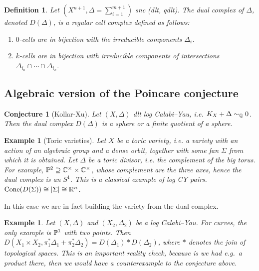 \documentclass[A4paper, british, reqno]{amsart}
\theoremstyle{darkgreentheorem}
\newtheorem{conj}[thm]{Conjecture}
\theoremstyle{darkbluedefinition}
\newtheorem{defn}[thm]{Definition}
\theoremstyle{darkredexample}
\newtheorem{exa}[thm]{Example}
\theoremstyle{remark}
\newcommand{\1}{\mathbbm{1}}
\begin{document}
\begin{defn}
    Let $(X^{n+1},\Delta=\sum_{i=1}^{m+1})$ snc (dlt, qdlt).
    The \textit{dual complex} of $\Delta$, denoted $D(\Delta)$, is a regular cell complex defined as follows:
    \begin{enumerate}
	\item $0$-cells are in bijection with the irreducible components $\Delta_{i}$.
	\item $k$-cells are in bijection with irreducible components of intersections $\Delta_{i_{0}}\cap \cdots \cap \Delta_{i_{k}}$.
    \end{enumerate}
\end{defn}

\subsection{Algebraic version of the Poincare conjecture}

\begin{conj}[Kollar-Xu]
    Let $(X,\Delta)$ dlt log Calabi--Yau, i.e. $K_{X}+\Delta\sim_{\Q} 0$.
    Then the dual complex $D(\Delta)$ is a sphere or a finite quotient of a sphere.
\end{conj}

\begin{exa}[Toric varieties]
    Let $X$ be a toric variety, i.e. a variety with an action of an algebraic group and a dense orbit, together with some fan $\Sigma$ from which it is obtained.
    Let $\Delta$ be a toric divisor, i.e. the complement of the big torus.
    For example, $\P^{2}\supseteq \C^{\times}\times \C^{\times}$, whose complement are the three axes, hence the dual complex is an $S^{1}$.
    This is a classical example of log CY pairs.
    $\operatorname{Cone}(D(\Sigma))\cong |\Sigma |\cong \R^{n}$.
\end{exa}

In this case we are in fact building the variety from the dual complex.

\begin{exa}
    Let $(X,\Delta)$ and $(X_{2},\Delta_{2})$ be a log Calabi--Yau.
    For curves, the only example is $\P^{1}$ with two points.
    Then $D(X_{1}\times X_{2},\pi_{1}^{*}\Delta_{1}+\pi_{2}^{*}\Delta_{2})=D(\Delta_{1})*D(\Delta_{2})$, where $*$ denotes the join of topological spaces.
    This is an important reality check, because is we had e.g.~a product there, then we would have a counterexample to the conjecture above.
\end{exa}
\end{document}

